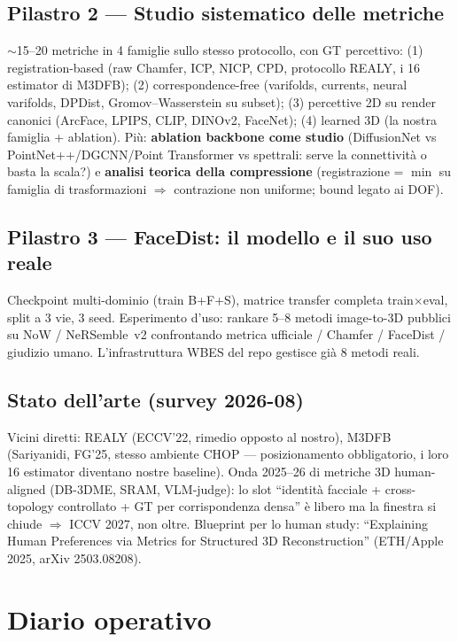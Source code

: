 \documentclass[11pt,a4paper]{article}
\begin{document}
\subsection{Pilastro 2 --- Studio sistematico delle metriche}
$\sim$15--20 metriche in 4 famiglie sullo stesso protocollo, con GT percettivo:
(1) registration-based (raw Chamfer, ICP, NICP, CPD, protocollo REALY, i 16 estimator
di M3DFB); (2) correspondence-free (varifolds, currents, neural varifolds, DPDist,
Gromov--Wasserstein su subset); (3) percettive 2D su render canonici (ArcFace, LPIPS,
CLIP, DINOv2, FaceNet); (4) learned 3D (la nostra famiglia + ablation).
Pi\`u: \textbf{ablation backbone come studio} (DiffusionNet vs PointNet++/DGCNN/Point
Transformer vs spettrali: serve la connettivit\`a o basta la scala?) e \textbf{analisi
teorica della compressione} (registrazione = $\min$ su famiglia di trasformazioni
$\Rightarrow$ contrazione non uniforme; bound legato ai DOF).

\subsection{Pilastro 3 --- FaceDist: il modello e il suo uso reale}
Checkpoint multi-dominio (train B+F+S), matrice transfer completa
train$\times$eval, split a 3 vie, 3 seed. Esperimento d'uso: rankare 5--8 metodi
image-to-3D pubblici su NoW / NeRSemble~v2 confrontando metrica ufficiale / Chamfer /
FaceDist / giudizio umano. L'infrastruttura WBES del repo gestisce gi\`a 8 metodi reali.

\subsection{Stato dell'arte (survey 2026-08)}
Vicini diretti: REALY (ECCV'22, rimedio opposto al nostro), M3DFB (Sariyanidi, FG'25,
stesso ambiente CHOP --- posizionamento obbligatorio, i loro 16 estimator diventano
nostre baseline). Onda 2025--26 di metriche 3D human-aligned (DB-3DME, SRAM, VLM-judge):
lo slot ``identit\`a facciale + cross-topology controllato + GT per corrispondenza densa''
\`e libero ma la finestra si chiude $\Rightarrow$ ICCV 2027, non oltre.
Blueprint per lo human study: ``Explaining Human Preferences via Metrics for Structured
3D Reconstruction'' (ETH/Apple 2025, arXiv 2503.08208).

\section{Diario operativo}
\end{document}
